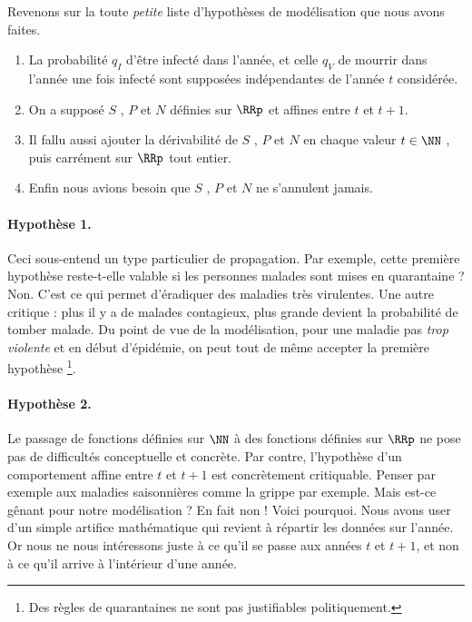 Revenons sur la toute \emph{\og petite \fg} liste d'hypothèses de modélisation que nous avons faites.

\begin{enumerate}
	\item La probabilité $q_I$ d'être infecté dans l'année, et celle $q_V$ de mourrir dans l'année une fois infecté sont supposées indépendantes de l'année $t$ considérée.

	\item On a supposé $S$ , $P$ et $N$ définies sur $\RRp$ et affines entre $t$ et $t+1$.

	\item Il fallu aussi ajouter la dérivabilité de $S$ , $P$ et $N$ en chaque valeur $t \in \NN$ , puis carrément sur $\RRp$ tout entier.

	\item Enfin nous avions besoin que $S$ , $P$ et $N$ ne s'annulent jamais.
\end{enumerate}




\paragraph{Hypothèse 1.} Ceci sous-entend un type particulier de propagation.
Par exemple, cette première hypothèse reste-t-elle valable si les personnes malades sont mises en quarantaine ? Non. C'est ce qui permet d'éradiquer des maladies très virulentes.
Une autre critique : plus il y a de malades contagieux, plus grande devient la probabilité de tomber malade. 
Du point de vue de la modélisation, pour une maladie pas \emph{\og trop violente \fg} et en début d'épidémie, on peut tout de même accepter la première hypothèse
\footnote{
	Des règles de quarantaines ne sont pas justifiables politiquement.
}.




\paragraph{Hypothèse 2.} Le passage de fonctions définies sur $\NN$ à des fonctions définies sur $\RRp$ ne pose pas de difficultés conceptuelle et concrète. Par contre, l'hypothèse d'un comportement affine entre $t$ et $t+1$ est concrètement critiquable. Penser par exemple aux maladies saisonnières comme la grippe par exemple. 
Mais est-ce gênant pour notre modélisation ? En fait non ! Voici pourquoi. Nous avons user d'un simple artifice mathématique qui revient à répartir les données sur l'année. Or nous ne nous intéressons juste à ce qu'il se passe aux années $t$ et $t+1$, et non à ce qu'il arrive à l'intérieur d'une année.


